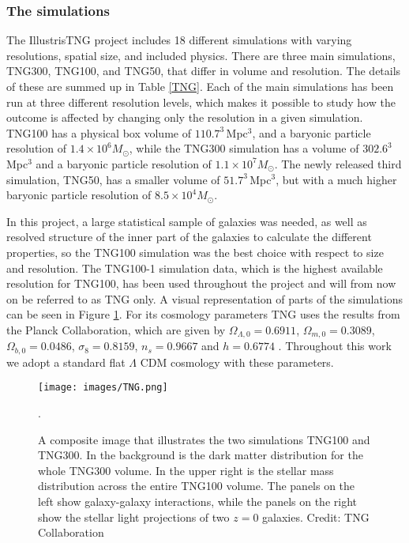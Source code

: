 \subsubsection{The simulations}
The IllustrisTNG project includes 18 different simulations with varying resolutions, spatial size, and included physics. There are three main simulations, TNG300, TNG100, and TNG50, that differ in volume and resolution. The details of these are summed up in Table \ref{TNG}. Each of the main simulations has been run at three different resolution levels, which makes it possible to study how the outcome is affected by changing only the resolution in a given simulation. TNG100 has a physical box volume of $110.7^3 \, $Mpc$^3$, and a baryonic particle resolution of $1.4 \times 10^6 M_{\odot}$, while the TNG300 simulation has a volume of $302.6^3 \, $Mpc$^3$ and a baryonic particle resolution of $1.1 \times 10^7 M_{\odot}$. The newly released third simulation, TNG50, has a smaller volume of $51.7^3 \, $Mpc$^3$, but with a much higher baryonic particle resolution of $8.5 \times 10^4 M_{\odot}$. 

In this project, a large statistical sample of galaxies was needed, as well as resolved structure of the inner part of the galaxies to calculate the different properties, so the TNG100 simulation was the best choice with respect to size and resolution. The TNG100-1 simulation data, which is the highest available resolution for TNG100, has been used throughout the project and will from now on be referred to as TNG only. A visual representation of parts of the simulations can be seen in Figure \ref{tng_illustration}. For its cosmology parameters TNG uses the results from the Planck Collaboration, which are given by $\Omega_{\Lambda,0} = 0.6911$, $\Omega_{m,0}=0.3089$, $\Omega_{b,0}=0.0486$, $\sigma_8=0.8159$, $n_s=0.9667$ and $h = 0.6774$ \parencite{Planck2016}. Throughout this work we adopt a standard flat $\Lambda$ CDM cosmology with these parameters.

\begin{figure}
    \centering
    \texttt{[image: images/TNG.png]}
    \caption{A composite image that illustrates the two simulations TNG100 and TNG300. In the background is the dark matter distribution for the whole TNG300 volume. In the upper right is the stellar mass distribution across the entire TNG100 volume. The panels on the left show galaxy-galaxy interactions, while the panels on the right show the stellar light projections of two $z=0$ galaxies. Credit: TNG Collaboration}.
    \label{tng_illustration}
\end{figure}

